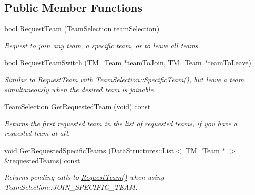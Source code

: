 \subsection*{Public Member Functions}
\begin{DoxyCompactItemize}
\item 
bool \hyperlink{class_rak_net_1_1_t_m___team_member_a964be9af8c1d4e91367406379502ef56}{Request\-Team} (\hyperlink{struct_rak_net_1_1_team_selection}{Team\-Selection} team\-Selection)
\begin{DoxyCompactList}\small\item\em Request to join any team, a specific team, or to leave all teams. \end{DoxyCompactList}\item 
bool \hyperlink{class_rak_net_1_1_t_m___team_member_a27aaf07915c7c5071064f3c7e7cb78bd}{Request\-Team\-Switch} (\hyperlink{class_rak_net_1_1_t_m___team}{T\-M\-\_\-\-Team} $\ast$team\-To\-Join, \hyperlink{class_rak_net_1_1_t_m___team}{T\-M\-\_\-\-Team} $\ast$team\-To\-Leave)
\begin{DoxyCompactList}\small\item\em Similar to Request\-Team with \hyperlink{struct_rak_net_1_1_team_selection_acd3b970f35fa016ee969981f6d4ea1ab}{Team\-Selection\-::\-Specific\-Team()}, but leave a team simultaneously when the desired team is joinable. \end{DoxyCompactList}\item 
\hyperlink{struct_rak_net_1_1_team_selection}{Team\-Selection} \hyperlink{class_rak_net_1_1_t_m___team_member_a392d7b4cf88e7a97e89ec2f974e04822}{Get\-Requested\-Team} (void) const 
\begin{DoxyCompactList}\small\item\em Returns the first requested team in the list of requested teams, if you have a requested team at all. \end{DoxyCompactList}\item 
void \hyperlink{class_rak_net_1_1_t_m___team_member_a64d33e1745f31b05b29efa7fe1db1179}{Get\-Requested\-Specific\-Teams} (\hyperlink{class_data_structures_1_1_list}{Data\-Structures\-::\-List}$<$ \hyperlink{class_rak_net_1_1_t_m___team}{T\-M\-\_\-\-Team} $\ast$ $>$ \&requested\-Teams) const 
\begin{DoxyCompactList}\small\item\em Returns pending calls to \hyperlink{class_rak_net_1_1_t_m___team_member_a964be9af8c1d4e91367406379502ef56}{Request\-Team()} when using Team\-Selection\-::\-J\-O\-I\-N\-\_\-\-S\-P\-E\-C\-I\-F\-I\-C\-\_\-\-T\-E\-A\-M. \end{DoxyCompactList}\item 

\end{DoxyCompactItemize}
